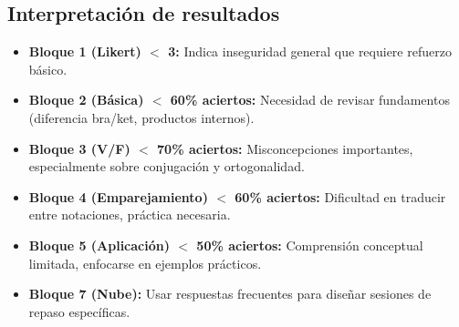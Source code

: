 \documentclass{unirTema}
\begin{document}
\subsection*{Interpretación de resultados}

\begin{itemize}
  \item \textbf{Bloque 1 (Likert) $<$ 3:} Indica inseguridad general que requiere refuerzo básico.
  \item \textbf{Bloque 2 (Básica) $<$ 60\% aciertos:} Necesidad de revisar fundamentos (diferencia bra/ket, productos internos).
  \item \textbf{Bloque 3 (V/F) $<$ 70\% aciertos:} Misconcepciones importantes, especialmente sobre conjugación y ortogonalidad.
  \item \textbf{Bloque 4 (Emparejamiento) $<$ 60\% aciertos:} Dificultad en traducir entre notaciones, práctica necesaria.
  \item \textbf{Bloque 5 (Aplicación) $<$ 50\% aciertos:} Comprensión conceptual limitada, enfocarse en ejemplos prácticos.
  \item \textbf{Bloque 7 (Nube):} Usar respuestas frecuentes para diseñar sesiones de repaso específicas.
\end{itemize}
\end{document}
